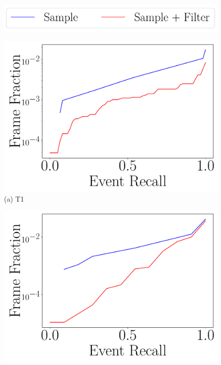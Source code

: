 \begin{figure}[h]
\centering
\includegraphics[width=0.7\linewidth]{FIGS/fig-recall-frame-aggregated-legend.pdf}

\begin{minipage}[]{0.47\linewidth}
\centering
\includegraphics[trim={0.5cm 0.5cm 0 0},clip,width=\linewidth]{FIGS/fig-random-select-and-filter-recall-frame-okutama-aggregated.pdf}\\
{(a) T1}
\end{minipage}
\begin{minipage}[]{0.47\linewidth}
\centering
\includegraphics[trim={0.5cm 0.5cm 0 0},clip,width=\linewidth]{FIGS/fig-random-select-and-filter-recall-frame-stanford-aggregated.pdf}

\end{minipage}
\end{figure}
